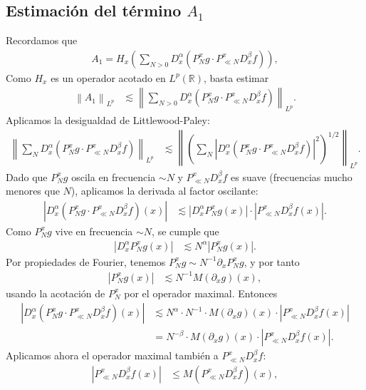 \documentclass{aleph-revista}
\providecommand{\norm}[1]{\left\|#1\right\|}
\begin{document}
\subsection*{Estimación del término $A_1$}
  Recordamos que
  \begin{align*}
    A_1 = H_x\left( \sum_{N > 0} D_x^\alpha \left( P_N^x g \cdot P_{\ll N}^x D_x^\beta f \right) \right),
  \end{align*}
  Como $H_x$ es un operador acotado en $L^p(\mathbb{R})$, basta estimar
  \begin{align*}
    \norm{A_1}_{L^p}
    &\lesssim \left\| \sum_{N > 0} D_x^\alpha \left( P_N^x g \cdot P_{\ll N}^x D_x^\beta f \right) \right\|_{L^p}.
  \end{align*}
  Aplicamos la desigualdad de Littlewood-Paley:
  \begin{align*}
    \norm{\sum_{N} D_x^\alpha \left( P_N^x g \cdot P_{\ll N}^x D_x^\beta f \right)}_{L^p}
    &\lesssim \norm{\left( \sum_{N} |D_x^\alpha (P_N^x g \cdot P_{\ll N}^x D_x^\beta f)|^2 \right)^{1/2}}_{L^p}.
  \end{align*}
  Dado que $P_N^x g$ oscila en frecuencia $\sim N$ y $P_{\ll N}^x D_x^\beta f$ es suave (frecuencias mucho menores que $N$), aplicamos la derivada al factor oscilante:
  \begin{align*}
    |D_x^\alpha (P_N^x g \cdot P_{\ll N}^x D_x^\beta f)(x)|
    &\lesssim |D_x^\alpha P_N^x g(x)| \cdot |P_{\ll N}^x D_x^\beta f(x)|.
  \end{align*}
  Como $P_N^x g$ vive en frecuencia $\sim N$, se cumple que
  \begin{align*}
    |D_x^\alpha P_N^x g(x)| &\lesssim N^\alpha |P_N^x g(x)|.
  \end{align*}
  Por propiedades de Fourier, tenemos $P_N^x g \sim N^{-1} \partial_x P_N^x g$, y por tanto
  \begin{align*}
    |P_N^x g(x)| &\lesssim N^{-1} M(\partial_x g)(x),
  \end{align*}
  usando la acotación de $P_N^x$ por el operador maximal.
  Entonces
  \begin{align*}
    |D_x^\alpha (P_N^x g \cdot P_{\ll N}^x D_x^\beta f)(x)|
    &\lesssim N^\alpha \cdot N^{-1} \cdot M(\partial_x g)(x) \cdot |P_{\ll N}^x D_x^\beta f(x)| \\
    &= N^{-\beta} \cdot M(\partial_x g)(x) \cdot |P_{\ll N}^x D_x^\beta f(x)|.
  \end{align*}
  Aplicamos ahora el operador maximal también a $P_{\ll N}^x D_x^\beta f$:
  \begin{align*}
    |P_{\ll N}^x D_x^\beta f(x)|
    &\leq M(P_{\ll N}^x D_x^\beta f)(x),
  \end{align*}
\end{document}
